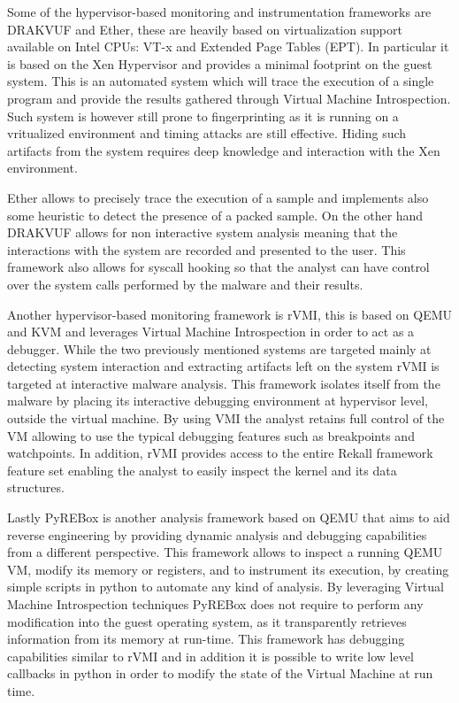 Some of the hypervisor-based monitoring and instrumentation frameworks are DRAKVUF and Ether, these are heavily based on virtualization support available on Intel CPUs: VT-x and Extended Page Tables (EPT). In particular it is based on the Xen Hypervisor and provides a minimal footprint on the guest system. This is an automated system which will trace the execution of a single program and provide the results gathered through Virtual Machine Introspection. Such system is however still prone to fingerprinting as it is running on a vritualized environment and timing attacks are still effective. Hiding such artifacts from the system requires deep knowledge and interaction with the Xen environment. 

Ether allows to precisely trace the execution of a sample and implements also some heuristic to detect the presence of a packed sample. On the other hand DRAKVUF allows for non interactive system analysis meaning that the interactions with the system are recorded and presented to the user. This framework also allows for syscall hooking so that the analyst can have control over the system calls performed by the malware and their results. 

Another hypervisor-based monitoring framework is rVMI, this is based on QEMU and KVM and leverages Virtual Machine Introspection in order to act as a debugger. While the two previously mentioned systems are targeted mainly at detecting system interaction and extracting artifacts left on the system rVMI is targeted at interactive malware analysis. This framework isolates itself from the malware by placing its interactive debugging environment at hypervisor level, outside the virtual machine. By using VMI the analyst retains full control of the VM allowing to use the typical debugging features such as breakpoints and watchpoints. In addition, rVMI provides access to the entire Rekall framework feature set enabling the analyst to easily inspect the kernel and its data structures.

Lastly PyREBox is another analysis framework based on QEMU that aims to aid reverse engineering by providing dynamic analysis and debugging capabilities from a different perspective. This framework allows to inspect a running QEMU VM, modify its memory or registers, and to instrument its execution, by creating simple scripts in python to automate any kind of analysis. By leveraging Virtual Machine Introspection techniques PyREBox does not require to perform any modification into the guest operating system, as it transparently retrieves information from its memory at run-time. This framework has debugging capabilities similar to rVMI and in addition it is possible to write low level callbacks in python in order to modify the state of the Virtual Machine at run time. 

